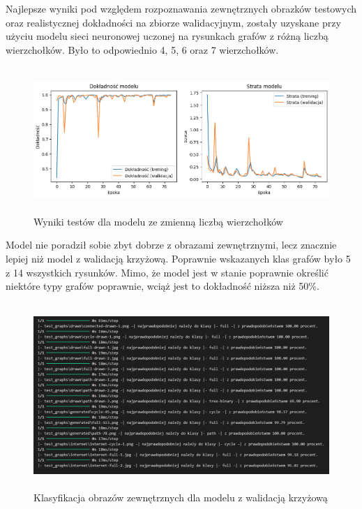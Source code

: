 Najlepsze wyniki pod względem rozpoznawania zewnętrznych obrazków testowych
oraz realistycznej dokładności na zbiorze walidacyjnym,
zostały uzyskane przy użyciu modelu sieci neuronowej uczonej na rysunkach grafów z różną liczbą wierzchołków.
Było to odpowiednio 4, 5, 6 oraz 7 wierzchołków.

\begin{figure}[ht]
	\centering
	\includegraphics[height=5.5cm]{resources/tests/images/v3/multiple_edges_img.png}
	\caption{Wyniki testów dla modelu ze zmienną liczbą wierzchołków}
	\label{Fig:tests-var-1}
\end{figure}
\FloatBarrier

Model nie poradził sobie zbyt dobrze z obrazami zewnętrznymi, lecz znacznie lepiej niż model z walidacją krzyżową.
Poprawnie wskazanych klas grafów było 5 z 14 wszystkich rysunków.
Mimo, że model jest w stanie poprawnie określić niektóre typy grafów poprawnie,
wciąż jest to dokładność niższa niż 50\%.

\begin{figure}[ht]
	\centering
	\includegraphics[height=7cm]{resources/tests/images/v3/multiple_edges_txt.png}
	\caption{Klasyfikacja obrazów zewnętrznych dla modelu z walidacją krzyżową}
	\label{Fig:tests-var-2}
\end{figure}
\FloatBarrier